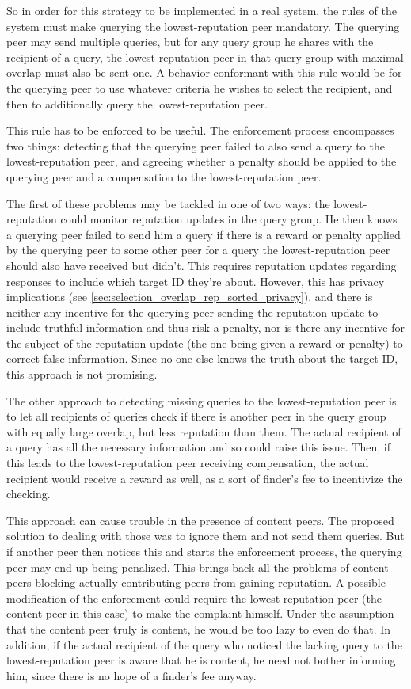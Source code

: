 So in order for this strategy to be implemented in a real system, the rules of
the system must make querying the lowest-reputation peer mandatory. The querying
peer may send multiple queries, but for any query group he shares with the
recipient of a query, the lowest-reputation peer in that query group with
maximal overlap must also be sent one. A behavior conformant with this rule
would be for the querying peer to use whatever criteria he wishes to select the
recipient, and then to additionally query the lowest-reputation peer.

This rule has to be enforced to be useful. The enforcement process encompasses
two things: detecting that the querying peer failed to also send a query to the
lowest-reputation peer, and agreeing whether a penalty should be applied to the
querying peer and a compensation to the lowest-reputation peer.

The first of these problems may be tackled in one of two ways: the
lowest-reputation could monitor reputation updates in the query group. He then
knows a querying peer failed to send him a query if there is a reward or penalty
applied by the querying peer to some other peer for a query the
lowest-reputation peer should also have received but didn't. This requires
reputation updates regarding responses to include which target ID they're about.
However, this has privacy implications (see
\ref{sec:selection_overlap_rep_sorted_privacy}), and there is neither any
incentive for the querying peer sending the reputation update to include
truthful information and thus risk a penalty, nor is there any incentive for the
subject of the reputation update (the one being given a reward or penalty) to
correct false information. Since no one else knows the truth about the target
ID, this approach is not promising.

The other approach to detecting missing queries to the lowest-reputation peer is
to let all recipients of queries check if there is another peer in the query
group with equally large overlap, but less reputation than them. The actual
recipient of a query has all the necessary information and so could raise this
issue. Then, if this leads to the lowest-reputation peer receiving compensation,
the actual recipient would receive a reward as well, as a sort of finder's fee
to incentivize the checking.

This approach can cause trouble in the presence of content peers. The proposed
solution to dealing with those was to ignore them and not send them queries. But
if another peer then notices this and starts the enforcement process, the
querying peer may end up being penalized. This brings back all the problems of
content peers blocking actually contributing peers from gaining reputation. A
possible modification of the enforcement could require the lowest-reputation
peer (the content peer in this case) to make the complaint himself. Under the
assumption that the content peer truly is content, he would be too lazy to even
do that. In addition, if the actual recipient of the query who noticed the
lacking query to the lowest-reputation peer is aware that he is content, he need
not bother informing him, since there is no hope of a finder's fee anyway.

